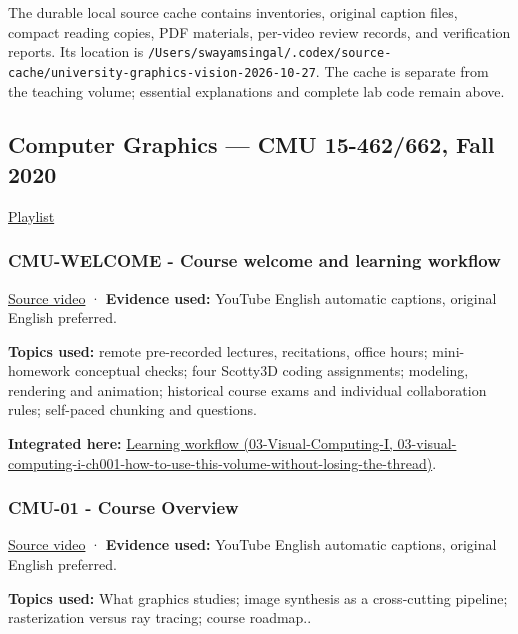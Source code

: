 The durable local source cache contains inventories, original caption files, compact reading copies, PDF materials, per-video review records, and verification reports. Its location is \texttt{/Users/swayamsingal/.codex/source-cache/university-graphics-vision-2026-10-27}. The cache is separate from the teaching volume; essential explanations and complete lab code remain above.

\subsection{Computer Graphics --- CMU 15-462/662, Fall 2020}\label{04-visual-computing-ii-ch036-computer-graphics-cmu-15-462662-fall-2020}

\href{https://www.youtube.com/playlist?list=PL9_jI1bdZmz2emSh0UQ5iOdT2xRHFHL7E}{Playlist}

\subsubsection{CMU-WELCOME - Course welcome and learning workflow}\label{04-visual-computing-ii-ch036-cmu-welcome---course-welcome-and-learning-workflow}

\href{https://www.youtube.com/watch?v=W6yEALqsD7k}{Source video} · \textbf{Evidence used:} YouTube English automatic captions, original English preferred.

\textbf{Topics used:} remote pre-recorded lectures, recitations, office hours; mini-homework conceptual checks; four Scotty3D coding assignments; modeling, rendering and animation; historical course exams and individual collaboration rules; self-paced chunking and questions.

\textbf{Integrated here:} \href{../03-Visual-Computing-I/main.pdf\#nameddest=03-visual-computing-i-ch001-how-to-use-this-volume-without-losing-the-thread}{Learning workflow (03-Visual-Computing-I, 03-visual-computing-i-ch001-how-to-use-this-volume-without-losing-the-thread)}.

\subsubsection{CMU-01 - Course Overview}\label{04-visual-computing-ii-ch036-cmu-01---course-overview}

\href{https://www.youtube.com/watch?v=PhxV_JrXeVk}{Source video} · \textbf{Evidence used:} YouTube English automatic captions, original English preferred.

\textbf{Topics used:} What graphics studies; image synthesis as a cross-cutting pipeline; rasterization versus ray tracing; course roadmap..

